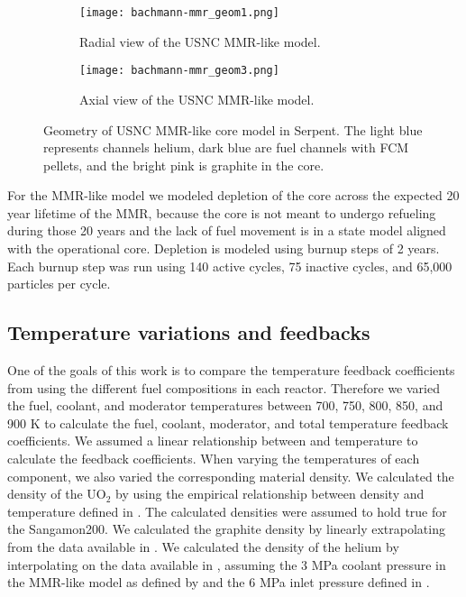 \begin{figure}
        \begin{subfigure}{0.48\textwidth}
                \centering
                \texttt{[image: bachmann-mmr\_geom1.png]}
                \caption{Radial view of the USNC MMR-like model.}
                \label{fig:mmr_radial}
        \end{subfigure}
        \hfill 
        \begin{subfigure}{0.48\textwidth}
                \centering
                \texttt{[image: bachmann-mmr\_geom3.png]}
                \caption{Axial view of the USNC MMR-like model.}
                \label{fig:mmr_axial}
        \end{subfigure}
        \caption{Geometry of USNC MMR-like core model in Serpent. The 
        light blue represents channels helium, dark blue are fuel 
        channels with \gls{FCM} pellets, and the bright pink is graphite in the core.}
        \label{fig:mmr_core}
\end{figure}

For the \gls{MMR}-like model we modeled depletion of the core across the 
expected 20 year lifetime of the \gls{MMR}, because the core is not 
meant to undergo refueling during those 20 years and the lack of 
fuel movement is in a state model aligned with the operational core. 
Depletion is modeled using burnup steps of 2 years. Each burnup step 
was run using 140 active cycles, 75 inactive 
cycles, and 65,000 particles per cycle. 

\subsection{Temperature variations and feedbacks}
One of the goals of this work is to compare the temperature feedback 
coefficients from using the different fuel compositions in each 
reactor. Therefore we varied the fuel, coolant, and moderator temperatures 
between 700, 750, 800, 850, and 900 K to calculate the fuel, coolant, 
moderator, and total temperature feedback coefficients. We assumed a linear 
relationship between 
\keff and temperature to calculate the feedback coefficients. When varying the 
temperatures of each component, we also varied the corresponding material 
density. We calculated the 
density of the UO$_2$ by using the empirical relationship between density and 
temperature defined in \cite{fink_thermophysical_2000}. The calculated 
densities were assumed to hold true for the Sangamon200. 
We calculated the 
graphite density by linearly extrapolating from the data available in 
\cite{mceligot_thermal_nodate}. We calculated the density of the helium 
by interpolating on the data available in \cite{petersen_properties_nodate}, 
assuming the 3 MPa coolant pressure in the \gls{MMR}-like model as defined 
by \cite{noauthor_usnc_2021} and the 6 MPa inlet pressure defined in 
\cite{mulder_overview_2021}. 

